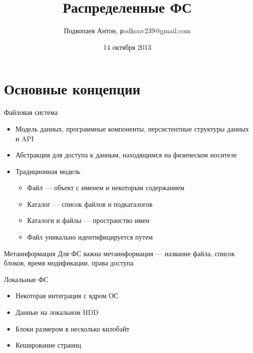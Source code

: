 \documentclass[sans]{beamer}
\begin{document}
\title[РФС]{Распределенные ФС}


\author
[Подкопаев Антон]{Подкопаев Антон, \texttt podkoav239@gmail.com}
\date [07-10-13]{14 октября 2013}



\begin{frame}[plain]
	\titlepage
\end{frame}

\section{Основные концепции}

\begin{frame}{Файловая система}
	\begin{itemize}
		\item Модель данных, программные компоненты, персистентные структуры данных и API
		\item Абстракция для доступа к данным, находящимся на физическом носителе
		\item Традиционная модель
		\begin{itemize}
			\item Файл --- объект с именем и некоторым содержанием
			\item Каталог --- список файлов и подкаталогов
			\item Каталоги и файлы --- пространство имен
			\item Файл уникально идентифицируется путем
		\end{itemize}
	\end{itemize}
\end{frame}

\begin{frame}{Метаинформация}
	Для ФС важна метаинформация --- название файла, список блоков, время модификации, права доступа 
\end{frame}

\begin{frame}{Локальные ФС}
	\begin{itemize}
		\item Некоторая интеграция с ядром ОС
		\item Данные на локальном HDD
		\item Блоки размером в несколько килобайт
		\item Кеширование страниц
	\end{itemize}
\end{frame}
\end{document}
